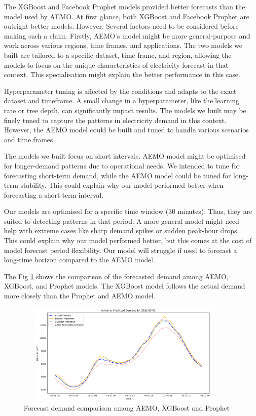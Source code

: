 \documentclass[mstat,12pt]{unswthesis}
\begin{document}
The XGBoost and Facebook Prophet models provided better forecasts than
the model used by AEMO. At first glance, both XGBoost and Facebook
Prophet are outright better models. However, Several factors need to be
considered before making such a claim. Firstly, AEMO's model might be
more general-purpose and work across various regions, time frames, and
applications. The two models we built are tailored to a specific
dataset, time frame, and region, allowing the models to focus on the
unique characteristics of electricity forecast in that context. This
specialisation might explain the better performance in this case.

Hyperparameter tuning is affected by the conditions and adapts to the
exact dataset and timeframe. A small change in a hyperparameter, like
the learning rate or tree depth, can significantly impact results. The
models we built may be finely tuned to capture the patterns in
electricity demand in this context. However, the AEMO model could be
built and tuned to handle various scenarios and time frames.

The models we built focus on short intervals. AEMO model might be
optimised for longer-demand patterns due to operational needs. We
intended to tune for forecasting short-term demand, while the AEMO model
could be tuned for long-term stability. This could explain why our model
performed better when forecasting a short-term interval.

Our models are optimised for a specific time window (30 minutes). Thus,
they are suited to detecting patterns in that period. A more general
model might need help with extreme cases like sharp demand spikes or
sudden peak-hour drops. This could explain why our model performed
better, but this comes at the cost of model forecast period flexibility.
Our model will struggle if used to forecast a long-time horizon compared
to the AEMO model.

The Fig \ref{AEMO_Prophet_XGBoost} shows the comparison of the
forecasted demand among AEMO, XGBoost, and Prophet models. The XGBoost
model follows the actual demand more closely than the Prophet and AEMO
model.

\begin{figure}[H]
\centering
\includegraphics[width=0.95\textwidth, height=5cm]{AEMO_Prophet_XGBoost.png}
\caption{Forecast demand comparison among AEMO, XGBoost and Prophet}\label{AEMO_Prophet_XGBoost}
\end{figure}
\end{document}
